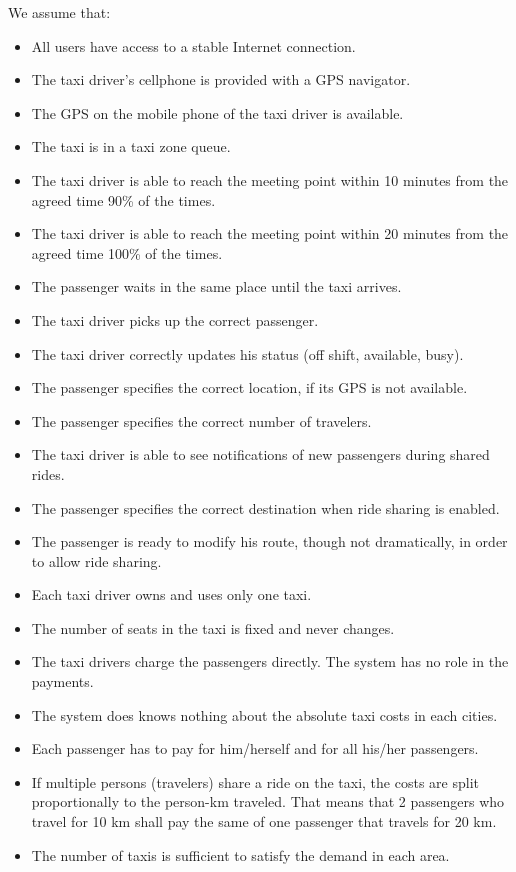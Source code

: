 We assume that:
\begin{itemize}
    \item All users have access to a stable Internet connection.
    \item The taxi driver's cellphone is provided with a GPS navigator.
    \item The GPS on the mobile phone of the taxi driver is available.
    \item The taxi is in a taxi zone queue.
    \item The taxi driver is able to reach the meeting point within 10 minutes from the agreed time 90\% of the times.
    \item The taxi driver is able to reach the meeting point within 20 minutes from the agreed time 100\% of the times.
    \item The passenger waits in the same place until the taxi arrives.
    \item The taxi driver picks up the correct passenger.
    \item The taxi driver correctly updates his status (off shift, available, busy).
    \item The passenger specifies the correct location, if its GPS is not available.
    \item The passenger specifies the correct number of travelers.
    \item The taxi driver is able to see notifications of new passengers during shared rides.
    \item The passenger specifies the correct destination when ride sharing is enabled.
    \item The passenger is ready to modify his route, though not dramatically, in order to allow ride sharing.
    \item Each taxi driver owns and uses only one taxi.
    \item The number of seats in the taxi is fixed and never changes.
    \item The taxi drivers charge the passengers directly. The system has no role in the payments.
    \item The system does knows nothing about the absolute taxi costs in each cities.
    \item Each passenger has to pay for him/herself and for all his/her passengers.
    \item If multiple persons (travelers) share a ride on the taxi, the costs are split proportionally to the person-km traveled. That means that 2 passengers who travel for 10 km shall pay the same of one passenger that travels for 20 km.
    \item The number of taxis is sufficient to satisfy the demand in each area.
\end{itemize}
